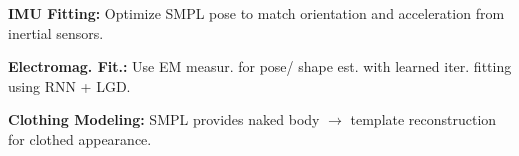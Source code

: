 \textbf{IMU Fitting:} Optimize SMPL pose to match orientation and acceleration from inertial sensors.

\textbf{Electromag. Fit.:} Use EM measur. for pose/ shape est. with learned iter. fitting using RNN + LGD.

\textbf{Clothing Modeling:} SMPL provides naked body $\to$ template reconstruction for clothed appearance.



